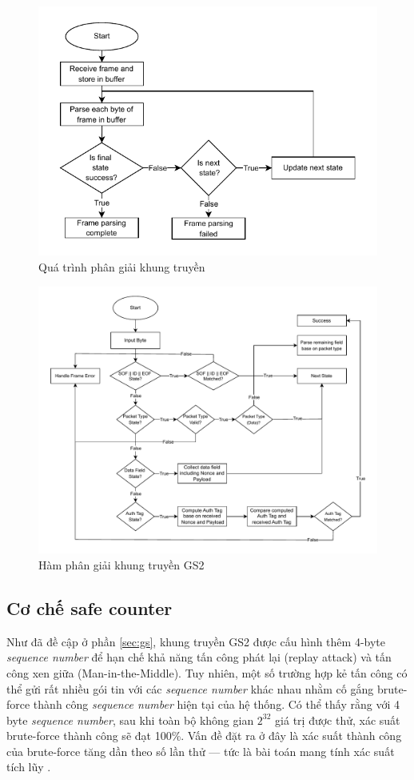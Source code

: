 \begin{figure}[h]
    \centering
    \includegraphics[width=0.7\linewidth]{frameparsing1.pdf}
    \caption{Quá trình phân giải khung truyền}
    \label{fig:parse-function}
\end{figure}

\begin{figure}[H]
    \centering
    \hspace*{-1.2cm}
    \includegraphics[width=1.1\linewidth]{frameparse.pdf}
    \caption{Hàm phân giải khung truyền GS2}
    \label{fig:parsing}
\end{figure}

\subsection{Cơ chế safe counter}
\label{sec:safe_counter}
Như đã đề cập ở phần \ref{sec:gs}, khung truyền GS2 được cấu hình thêm 4-byte \textit{sequence number} để hạn chế khả năng tấn công phát lại (replay attack) và tấn công xen giữa (Man-in-the-Middle). Tuy nhiên, một số trường hợp kẻ tấn công có thể gửi rất nhiều gói tin với các \textit{sequence number} khác nhau nhằm cố gắng brute-force thành công \textit{sequence number} hiện tại của hệ thống. Có thể thấy rằng với 4 byte \textit{sequence number}, sau khi toàn bộ không gian $2^{32}$ giá trị được thử, xác suất brute-force thành công sẽ đạt 100\%. Vấn đề đặt ra ở đây là xác suất thành công của brute-force tăng dần theo số lần thử — tức là bài toán mang tính xác suất tích lũy \cite{cumulative}. 

